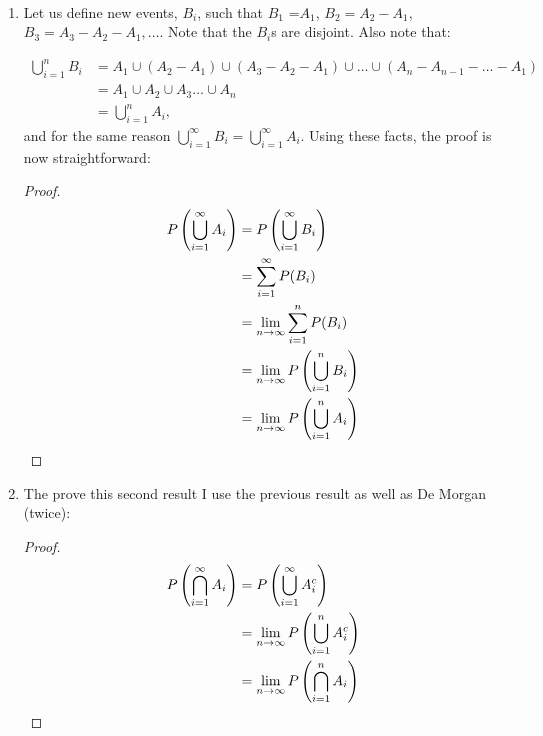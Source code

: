 \begin{problem}{21} $ $
	\begin{enumerate}
		\item
			Let us define new events, $B_i$, such that $B_1$ =$A_1$, $B_2 =A_2-A_1$, $B_3= A_3-A_2-A_1, \ldots$.  Note that the $B_i$s are disjoint.  Also note that:
			
			\begin{align*}
			\bigcup_{i=1}^n B_i & = A_1 \cup (A_2-A_1) \cup (A_3-A_2-A_1) \cup \ldots  \cup (A_n-A_{n-1}-\ldots -A_1)\\
			&=A_1\cup A_2 \cup A_3 \ldots \cup A_n\\
			&=\bigcup_{i=1}^n A_i,
			\end{align*}
and for the same reason $\bigcup_{i=1}^\infty B_i=\bigcup_{i=1}^\infty A_i$.  Using these facts, the proof is now straightforward:

		\begin{proof}
		\begin{align*}
		P\left(\bigcup_{i=1}^\infty A_i \right) &= P\left(\bigcup_{i=1}^\infty B_i\right) \\
		& = \sum_{i=1}^\infty P(B_i) \\
		& = \lim_{n \rightarrow \infty} \sum_{i=1}^n P(B_i) \\
		& = \lim_{n \rightarrow \infty} P\left (\bigcup_{i=1}^n B_i \right) \\
		& = \lim_{n \rightarrow \infty} P\left (\bigcup_{i=1}^n A_i \right)  \qedhere
		\end{align*}
	\end{proof}
	
	\item The prove this second result I use the previous result as well as De Morgan (twice):
	
		\begin{proof}
		\begin{align*}
		P\left (\bigcap_{i=1}^\infty A_i \right) &= P\left( \bigcup_{i=1}^\infty A_i^c \right) \\
		& = \lim_{n \rightarrow \infty} P\left(\bigcup_{i=1}^n A_i^c \right) \\
		& =\lim_{n \rightarrow \infty} P\left(\bigcap_{i=1}^n A_i\right)  \qedhere
		\end{align*}
	\end{proof}
			
	\end{enumerate}

\end{problem} 


